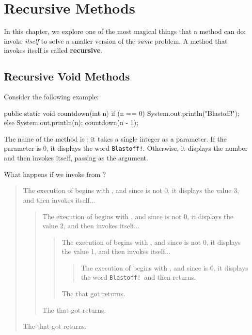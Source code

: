 \chapter{Recursive Methods}


In this chapter, we explore one of the most magical things that a method can do: invoke {\em itself} to solve a smaller version of the {\em same} problem.
A method that invokes itself is called {\bf recursive}.


\section{Recursive Void Methods}
\label{recursion}


Consider the following example:

\begin{code}
public static void countdown(int n) {
    if (n == 0) {
        System.out.println("Blastoff!");
    } else {
        System.out.println(n);
        countdown(n - 1);
    }
}
\end{code}

The name of the method is ; it takes a single integer as a parameter.
If the parameter is 0, it displays the word {\tt Blastoff!}.
Otherwise, it displays the number and then invokes itself, passing  as the argument.

What happens if we invoke  from ?

\vspace{-1ex}
\begin{quote}
The execution of  begins with , and since  is not 0, it displays the value 3, and then invokes itself...
\begin{quote}
The execution of  begins with , and since  is not 0, it displays the value 2, and then invokes itself...
\begin{quote}
The execution of  begins with , and since  is not 0, it displays the value 1, and then invokes itself...
\begin{quote}
The execution of  begins with , and since  is 0, it displays the word {\tt Blastoff!}\ and then returns.
\end{quote}
The  that got  returns.
\end{quote}
The  that got  returns.
\end{quote}
The  that got  returns.
\end{quote}
\vspace{-1ex}

